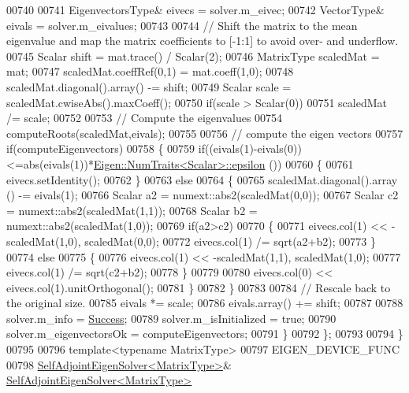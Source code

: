 \begin{DoxyCode}
00740     
00741     EigenvectorsType& eivecs = solver.m\_eivec;
00742     VectorType& eivals = solver.m\_eivalues;
00743   
00744     \textcolor{comment}{// Shift the matrix to the mean eigenvalue and map the matrix coefficients to [-1:1] to avoid over- and
       underflow.}
00745     Scalar shift = mat.trace() / Scalar(2);
00746     MatrixType scaledMat = mat;
00747     scaledMat.coeffRef(0,1) = mat.coeff(1,0);
00748     scaledMat.diagonal().array() -= shift;
00749     Scalar scale = scaledMat.cwiseAbs().maxCoeff();
00750     \textcolor{keywordflow}{if}(scale > Scalar(0))
00751       scaledMat /= scale;
00752 
00753     \textcolor{comment}{// Compute the eigenvalues}
00754     computeRoots(scaledMat,eivals);
00755 
00756     \textcolor{comment}{// compute the eigen vectors}
00757     \textcolor{keywordflow}{if}(computeEigenvectors)
00758     \{
00759       \textcolor{keywordflow}{if}((eivals(1)-eivals(0))<=abs(eivals(1))*\hyperlink{group___core___module_struct_eigen_1_1_num_traits}{Eigen::NumTraits<Scalar>::epsilon}
      ())
00760       \{
00761         eivecs.setIdentity();
00762       \}
00763       \textcolor{keywordflow}{else}
00764       \{
00765         scaledMat.diagonal().array () -= eivals(1);
00766         Scalar a2 = numext::abs2(scaledMat(0,0));
00767         Scalar c2 = numext::abs2(scaledMat(1,1));
00768         Scalar b2 = numext::abs2(scaledMat(1,0));
00769         \textcolor{keywordflow}{if}(a2>c2)
00770         \{
00771           eivecs.col(1) << -scaledMat(1,0), scaledMat(0,0);
00772           eivecs.col(1) /= sqrt(a2+b2);
00773         \}
00774         \textcolor{keywordflow}{else}
00775         \{
00776           eivecs.col(1) << -scaledMat(1,1), scaledMat(1,0);
00777           eivecs.col(1) /= sqrt(c2+b2);
00778         \}
00779 
00780         eivecs.col(0) << eivecs.col(1).unitOrthogonal();
00781       \}
00782     \}
00783 
00784     \textcolor{comment}{// Rescale back to the original size.}
00785     eivals *= scale;
00786     eivals.array() += shift;
00787 
00788     solver.m\_info = \hyperlink{group__enums_gga85fad7b87587764e5cf6b513a9e0ee5ea52581b035f4b59c203b8ff999ef5fcea}{Success};
00789     solver.m\_isInitialized = \textcolor{keyword}{true};
00790     solver.m\_eigenvectorsOk = computeEigenvectors;
00791   \}
00792 \};
00793 
00794 \}
00795 
00796 \textcolor{keyword}{template}<\textcolor{keyword}{typename} MatrixType>
00797 EIGEN\_DEVICE\_FUNC
00798 \hyperlink{group___eigenvalues___module_class_eigen_1_1_self_adjoint_eigen_solver}{SelfAdjointEigenSolver<MatrixType>}& 
      \hyperlink{group___eigenvalues___module_a40b0a68841d6176b1ab98743cc82bef4}{SelfAdjointEigenSolver<MatrixType>}

\end{DoxyCode}
